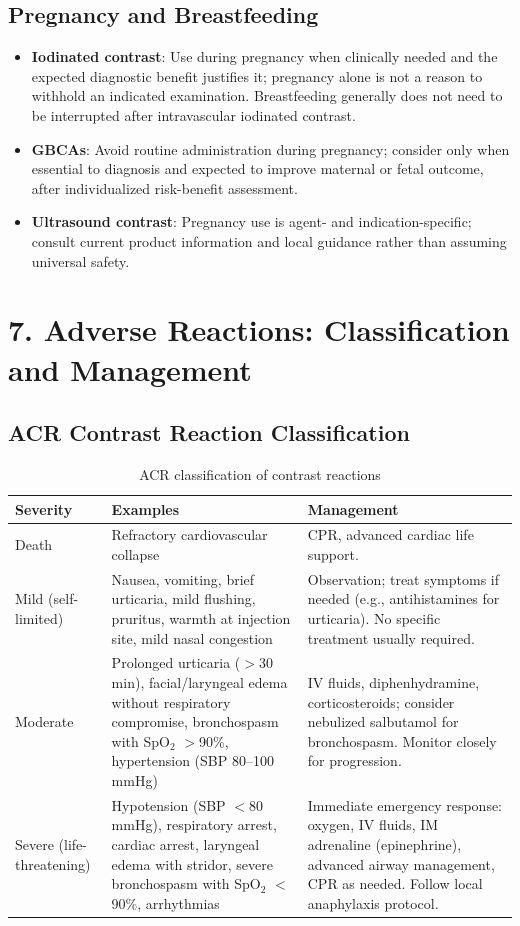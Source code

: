 \subsection*{Pregnancy and Breastfeeding}
\begin{itemize}
    \item \textbf{Iodinated contrast}: Use during pregnancy when clinically needed and the expected diagnostic benefit justifies it; pregnancy alone is not a reason to withhold an indicated examination. Breastfeeding generally does not need to be interrupted after intravascular iodinated contrast.
    \item \textbf{GBCAs}: Avoid routine administration during pregnancy; consider only when essential to diagnosis and expected to improve maternal or fetal outcome, after individualized risk-benefit assessment.
    \item \textbf{Ultrasound contrast}: Pregnancy use is agent- and indication-specific; consult current product information and local guidance rather than assuming universal safety.
\end{itemize}


\section*{7. Adverse Reactions: Classification and Management}

\subsection*{ACR Contrast Reaction Classification}

\begin{table}[h]
\centering
\caption{ACR classification of contrast reactions}
\begin{tabular}{|p{}|p{}|p{}|}
\hline
\textbf{Severity} & \textbf{Examples} & \textbf{Management} \\
\hline
Death & Refractory cardiovascular collapse & CPR, advanced cardiac life support. \\
\hline
Mild (self-limited) & Nausea, vomiting, brief urticaria, mild flushing, pruritus, warmth at injection site, mild nasal congestion & Observation; treat symptoms if needed (e.g., antihistamines for urticaria). No specific treatment usually required. \\
\hline
Moderate & Prolonged urticaria ($>$30 min), facial/laryngeal edema without respiratory compromise, bronchospasm with SpO$_2$ $>$90\%, hypertension (SBP 80--100 mmHg) & IV fluids, diphenhydramine, corticosteroids; consider nebulized salbutamol for bronchospasm. Monitor closely for progression. \\
\hline
Severe (life-threatening) & Hypotension (SBP $<$80 mmHg), respiratory arrest, cardiac arrest, laryngeal edema with stridor, severe bronchospasm with SpO$_2$ $<$90\%, arrhythmias & Immediate emergency response: oxygen, IV fluids, IM adrenaline (epinephrine), advanced airway management, CPR as needed. Follow local anaphylaxis protocol. \\
\hline
\end{tabular}
\end{table}

